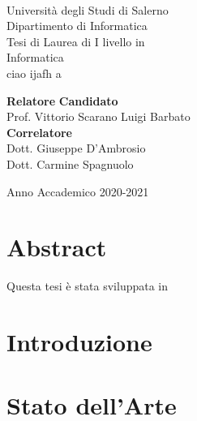 \documentclass[11pt,oneside]{book}
\begin{document}

\begin{titlepage}
\begin{center}
\\[0.2truecm]
{\Large Universit\`a degli Studi di Salerno}\\[0.2truecm]
{\large Dipartimento di Informatica}\\
\hrulefill
\vfill
{\large Tesi di Laurea di I livello in }\\[0.2truecm]
{\Large Informatica}\\
\vfill\vfill
{\Huge ciao ijafh a}
\vfill\vfill


{\bf Relatore} \hfill {\bf Candidato}\ \ \\
Prof. Vittorio Scarano \hfill Luigi Barbato\\
{\bf Correlatore} \hfill {\bf }\ \ \\
Dott. Giuseppe D'Ambrosio \hfill \ \ \\
Dott. Carmine Spagnuolo \hfill \ \ \\

\vfill
\hrulefill 

Anno Accademico 2020-2021

\end{center}
\end{titlepage}

\chapter*{Abstract}


\vfill
\centerline{\Large\sf Questa tesi è stata sviluppata in  }

\tableofcontents
\pagestyle{plain}

\chapter{Introduzione}
\setcounter{page}{1} 	%

 
\chapter{Stato dell'Arte}

\end{document}
